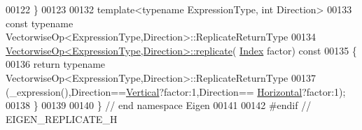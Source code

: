 \begin{DoxyCode}
00122 \}
00123 
00132 \textcolor{keyword}{template}<\textcolor{keyword}{typename} ExpressionType, \textcolor{keywordtype}{int} Direction>
00133 \textcolor{keyword}{const} \textcolor{keyword}{typename} VectorwiseOp<ExpressionType,Direction>::ReplicateReturnType
00134 \hyperlink{group___core___module_a5f0c8dc9e9c4aeaa2057f15800f5c18c}{VectorwiseOp<ExpressionType,Direction>::replicate}(
      \hyperlink{namespace_eigen_a62e77e0933482dafde8fe197d9a2cfde}{Index} factor)\textcolor{keyword}{ const}
00135 \textcolor{keyword}{}\{
00136   \textcolor{keywordflow}{return} \textcolor{keyword}{typename} VectorwiseOp<ExpressionType,Direction>::ReplicateReturnType
00137           (\_expression(),Direction==\hyperlink{group__enums_ggad49a7b3738e273eb00932271b36127f7addca718e0564723df21d61b94b1198be}{Vertical}?factor:1,Direction==
      \hyperlink{group__enums_ggad49a7b3738e273eb00932271b36127f7aae8a16b3b9272683c1162915f6d892be}{Horizontal}?factor:1);
00138 \}
00139 
00140 \} \textcolor{comment}{// end namespace Eigen}
00141 
00142 \textcolor{preprocessor}{#endif // EIGEN\_REPLICATE\_H}
\end{DoxyCode}
